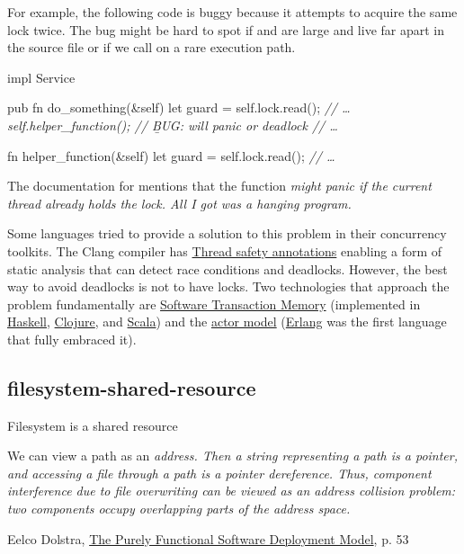 \documentclass{article}
\begin{document}
For example, the following code is buggy because it attempts to acquire the same lock twice.
The bug might be hard to spot if  and  are large and live far apart in the source file or if we call  on a rare execution path.

\begin{code}[bad]
impl Service {
  pub fn do_something(&self) {
    let guard = self.lock.read();
    \em{// \ldots }
    self.helper_function(); \em{// \b{BUG}: will panic or deadlock}
    \em{// \ldots }
  }

  fn helper_function(&self) {
    let guard = self.lock.read();
    \em{// \ldots }
  }
}
\end{code}

The documentation for \href{https://doc.rust-lang.org/std/sync/struct.RwLock.html#method.read}{} mentions that the function \em{might} panic if the current thread already holds the lock.
All I got was a hanging program.

Some languages tried to provide a solution to this problem in their concurrency toolkits.
The Clang compiler has \href{https://clang.llvm.org/docs/ThreadSafetyAnalysis.html}{Thread safety annotations} enabling a form of static analysis that can detect race conditions and deadlocks.
However, the best way to avoid deadlocks is not to have locks.
Two technologies that approach the problem fundamentally are \href{https://en.wikipedia.org/wiki/Software_transactional_memory}{Software Transaction Memory} (implemented in \href{https://wiki.haskell.org/Software_transactional_memory}{Haskell}, \href{https://clojure.org/reference/refs}{Clojure}, and \href{https://nbronson.github.io/scala-stm/}{Scala}) and the \href{https://en.wikipedia.org/wiki/Actor_model}{actor model} (\href{https://www.erlang.org/}{Erlang} was the first language that fully embraced it).

\subsection{filesystem-shared-resource}{Filesystem is a shared resource}
\epigraph{
    We can view a path as an \em{address}.
    Then a string representing a path is a pointer, and accessing a file through a path is a pointer dereference.
    Thus, component interference due to file overwriting can be viewed as an address collision problem: two components occupy overlapping parts of the address space.
}{Eelco Dolstra, \href{https://edolstra.github.io/pubs/phd-thesis.pdf}{The Purely Functional Software Deployment Model}, p. 53}
\end{document}
